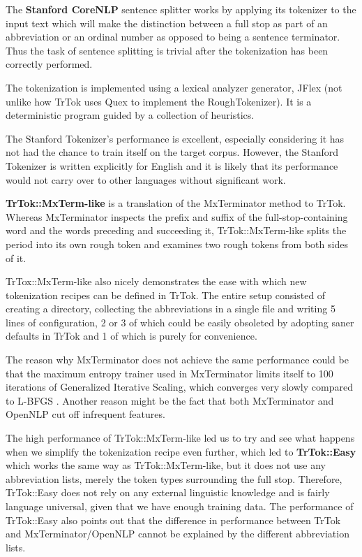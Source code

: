 The \textbf{Stanford CoreNLP} sentence splitter works by applying its
tokenizer to the input text which will make the distinction between a
full stop as part of an abbreviation or an ordinal number as opposed
to being a sentence terminator. Thus the task of sentence splitting is
trivial after the tokenization has been correctly performed.

The tokenization is implemented using a lexical analyzer generator,
JFlex (not unlike how TrTok uses Quex to implement the
RoughTokenizer). It is a deterministic program guided by a collection
of heuristics.

The Stanford Tokenizer's performance is excellent, especially
considering it has not had the chance to train itself on the target
corpus. However, the Stanford Tokenizer is written explicitly for
English and it is likely that its performance would not carry over to
other languages without significant work.

\textbf{TrTok::MxTerm-like} is a translation of the MxTerminator
method to TrTok. Whereas MxTerminator inspects the prefix and suffix
of the full-stop-containing word and the words preceding and
succeeding it, TrTok::MxTerm-like splits the period into its own rough
token and examines two rough tokens from both sides of it.

TrTox::MxTerm-like also nicely demonstrates the ease with which new
tokenization recipes can be defined in TrTok. The entire setup
consisted of creating a directory, collecting the abbreviations in a
single file and writing 5 lines of configuration, 2 or 3 of which
could be easily obsoleted by adopting saner defaults in TrTok and 1 of
which is purely for convenience.

The reason why MxTerminator does not achieve the same performance
could be that the maximum entropy trainer used in MxTerminator limits
itself to 100 iterations of Generalized Iterative Scaling, which
converges very slowly compared to L-BFGS \cite{maxent-algorithms}.
Another reason might be the fact that both MxTerminator and OpenNLP
cut off infrequent features.

The high performance of TrTok::MxTerm-like led us to try and see what
happens when we simplify the tokenization recipe even further, which
led to \textbf{TrTok::Easy} which works the same way as
TrTok::MxTerm-like, but it does not use any abbreviation lists, merely
the token types surrounding the full stop. Therefore, TrTok::Easy does
not rely on any external linguistic knowledge and is fairly language
universal, given that we have enough training data. The performance of
TrTok::Easy also points out that the difference in performance between
TrTok and MxTerminator/OpenNLP cannot be explained by the different
abbreviation lists.

